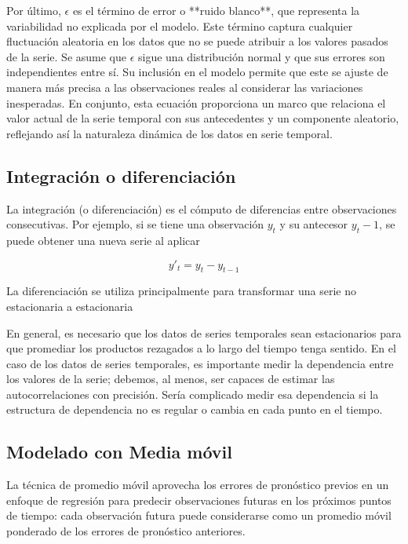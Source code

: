 Por último, \(\epsilon\) es el término de error o **ruido blanco**, que representa la variabilidad no explicada por el modelo. Este término captura cualquier fluctuación aleatoria en los datos que no se puede atribuir a los valores pasados de la serie. Se asume que \(\epsilon\) sigue una distribución normal y que sus errores son independientes entre sí. Su inclusión en el modelo permite que este se ajuste de manera más precisa a las observaciones reales al considerar las variaciones inesperadas. En conjunto, esta ecuación proporciona un marco que relaciona el valor actual de la serie temporal con sus antecedentes y un componente aleatorio, reflejando así la naturaleza dinámica de los datos en serie temporal.

\subsection{Integración o diferenciación}

La integración (o diferenciación) es el cómputo de diferencias entre observaciones consecutivas. Por ejemplo, si se tiene una observación \(y_t\) y su antecesor \(y_t-1\), se puede obtener una nueva serie al aplicar

\begin{equation}
y'_t = y_t - y_{t-1}
\label{eq:integration}
\end{equation}

La diferenciación se utiliza principalmente para transformar una serie no estacionaria a estacionaria

En general, es necesario que los datos de series temporales sean estacionarios para que promediar los productos rezagados a lo largo del tiempo tenga sentido. En el caso de los datos de series temporales, es importante medir la dependencia entre los valores de la serie; debemos, al menos, ser capaces de estimar las autocorrelaciones con precisión. Sería complicado medir esa dependencia si la estructura de dependencia no es regular o cambia en cada punto en el tiempo.

\subsection{Modelado con Media móvil}

La técnica de promedio móvil aprovecha los errores de pronóstico previos en un enfoque de regresión para predecir observaciones futuras en los próximos puntos de tiempo: cada observación futura puede considerarse como un promedio móvil ponderado de los errores de pronóstico anteriores.

